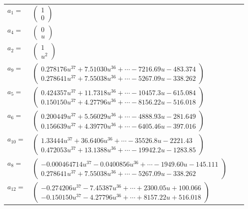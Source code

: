 \documentclass[1p]{elsarticle_modified}
\theoremstyle{definition}
\begin{document}
\begin{tabular}{m{7pt} m{180pt} m{7pt} m{180pt} }
\flushright $a_{1}=$&$\begin{pmatrix}1\\0\end{pmatrix}$ \\
\flushright $a_{4}=$&$\begin{pmatrix}0\\u\end{pmatrix}$ \\
\flushright $a_{2}=$&$\begin{pmatrix}1\\u^2\end{pmatrix}$ \\
\flushright $a_{9}=$&$\begin{pmatrix}0.278176 u^{37}+7.51030 u^{36}+\cdots-7216.69 u-483.374\\0.278641 u^{37}+7.55038 u^{36}+\cdots-5267.09 u-338.262\end{pmatrix}$ \\
\flushright $a_{5}=$&$\begin{pmatrix}0.424357 u^{37}+11.7318 u^{36}+\cdots-10457.3 u-615.084\\0.150150 u^{37}+4.27796 u^{36}+\cdots-8156.22 u-516.018\end{pmatrix}$ \\
\flushright $a_{6}=$&$\begin{pmatrix}0.200449 u^{37}+5.56029 u^{36}+\cdots-4888.93 u-281.649\\0.156639 u^{37}+4.39770 u^{36}+\cdots-6405.46 u-397.016\end{pmatrix}$ \\
\flushright $a_{10}=$&$\begin{pmatrix}1.33444 u^{37}+36.6406 u^{36}+\cdots-35526.8 u-2221.43\\0.472053 u^{37}+13.1388 u^{36}+\cdots-19942.2 u-1283.85\end{pmatrix}$ \\
\flushright $a_{8}=$&$\begin{pmatrix}-0.000464714 u^{37}-0.0400856 u^{36}+\cdots-1949.60 u-145.111\\0.278641 u^{37}+7.55038 u^{36}+\cdots-5267.09 u-338.262\end{pmatrix}$ \\
\flushright $a_{12}=$&$\begin{pmatrix}-0.274206 u^{37}-7.45387 u^{36}+\cdots+2300.05 u+100.066\\-0.150150 u^{37}-4.27796 u^{36}+\cdots+8157.22 u+516.018\end{pmatrix}$ \\

\end{tabular}
\end{document}
